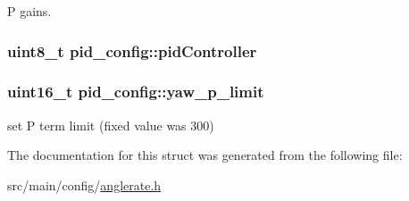 P gains. 

\hypertarget{structpid__config_a3f0331946c1a6113244bc307a198f8af}{
\subsubsection[{pid\+Controller}]{\setlength{\rightskip}{0pt plus 5cm}uint8\+\_\+t pid\+\_\+config\+::pid\+Controller}}\label{structpid__config_a3f0331946c1a6113244bc307a198f8af}
\hypertarget{structpid__config_a429d573cf47312fbe077498489f9ba08}{
\subsubsection[{yaw\+\_\+p\+\_\+limit}]{\setlength{\rightskip}{0pt plus 5cm}uint16\+\_\+t pid\+\_\+config\+::yaw\+\_\+p\+\_\+limit}}\label{structpid__config_a429d573cf47312fbe077498489f9ba08}


set P term limit (fixed value was 300) 



The documentation for this struct was generated from the following file\+:\begin{DoxyCompactItemize}
\item 
src/main/config/\hyperlink{config_2anglerate_8h}{anglerate.\+h}\end{DoxyCompactItemize}
